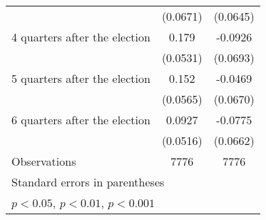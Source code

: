 \begin{table}[htbp]
\begin{tabular}{l*{2}{c}}
                    &    (0.0671)         &    (0.0645)         \\
[1em]
 4 quarters after the election&       0.179\sym{***}&     -0.0926         \\
                    &    (0.0531)         &    (0.0693)         \\
[1em]
 5 quarters after the election&       0.152\sym{**} &     -0.0469         \\
                    &    (0.0565)         &    (0.0670)         \\
[1em]
 6 quarters after the election&      0.0927         &     -0.0775         \\
                    &    (0.0516)         &    (0.0662)         \\
\hline
Observations        &        7776         &        7776         \\
\hline\hline
\multicolumn{3}{l}{\footnotesize Standard errors in parentheses}\\
\multicolumn{3}{l}{\footnotesize \sym{*} \(p<0.05\), \sym{**} \(p<0.01\), \sym{***} \(p<0.001\)}\\
\end{tabular}
\end{table}

